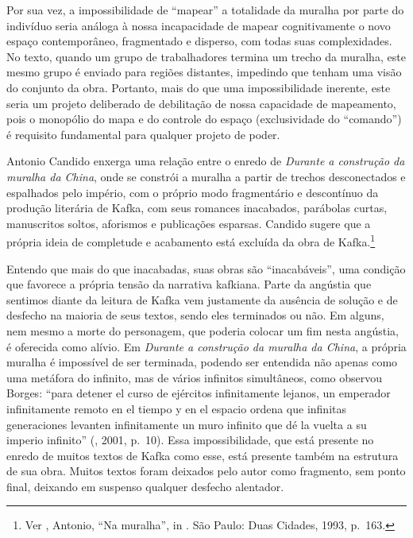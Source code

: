 Por sua vez, a impossibilidade de ``mapear'' a totalidade da muralha por
parte do indivíduo seria análoga à nossa incapacidade de mapear
cognitivamente o novo espaço contemporâneo, fragmentado e disperso, com
todas suas complexidades. No texto, quando um grupo de trabalhadores
termina um trecho da muralha, este mesmo grupo é enviado para regiões
distantes, impedindo que tenham uma visão do conjunto da obra. Portanto,
mais do que uma impossibilidade inerente, este seria um projeto
deliberado de debilitação de nossa capacidade de mapeamento, pois o
monopólio do mapa e do controle do espaço (exclusividade do ``comando'')
é requisito fundamental para qualquer projeto de poder.

Antonio Candido enxerga uma relação entre o enredo de \emph{Durante a
construção da muralha da China}, onde se constrói a muralha a partir de
trechos desconectados e espalhados pelo império, com o próprio modo
fragmentário e descontínuo da produção literária de Kafka, com seus
romances inacabados, parábolas curtas, manuscritos soltos, aforismos e
publicações esparsas. Candido sugere que a própria ideia de completude e
acabamento está excluída da obra de Kafka.\footnote{Ver ,
  Antonio, ``Na muralha'', in {}. São Paulo:
  Duas Cidades, 1993, p.~163.}

Entendo que mais do que inacabadas, suas obras são ``inacabáveis'', uma
condição que favorece a própria tensão da narrativa kafkiana. Parte da
angústia que sentimos diante da leitura de Kafka vem justamente da
ausência de solução e de desfecho na maioria de seus textos, sendo eles
terminados ou não. Em alguns, nem mesmo a morte do personagem, que
poderia colocar um fim nesta angústia, é oferecida como alívio. Em
\emph{Durante a construção da muralha da China}, a própria muralha é
impossível de ser terminada, podendo ser entendida não apenas como uma
metáfora do infinito, mas de vários infinitos simultâneos, como observou
Borges: ``para detener el curso de ejércitos infinitamente lejanos, un
emperador infinitamente remoto en el tiempo y en el espacio ordena que
infinitas generaciones levanten infinitamente un muro infinito que dé la
vuelta a su imperio infinito'' (, 2001, p.~10). Essa
impossibilidade, que está presente no enredo de muitos textos de Kafka
como esse, está presente também na estrutura de sua obra. Muitos textos
foram deixados pelo autor como fragmento, sem ponto final, deixando em
suspenso qualquer desfecho alentador.

